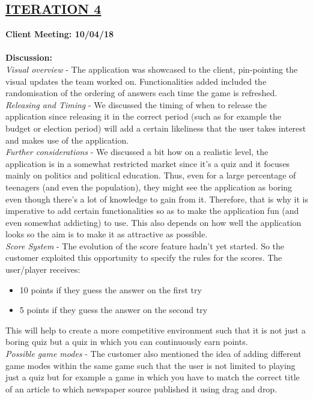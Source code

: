 \documentclass[paper=a4,fontsize=11pt]{article}
\newcommand{\SectionPart}[1]{\subsection*{\uppercase{#1}}}
\begin{document}
\SectionPart{\ul{Iteration 4}}
\hfill \textbf{Client Meeting: 10/04/18} \\
\\
\textbf{Discussion:}\\
\noindent
\textit{Visual overview} -
The application was showcased to the client, pin-pointing the visual updates the team worked on.
Functionalities added included the randomisation of the ordering of answers each time the game is refreshed.\\

\noindent
\textit{Releasing and Timing} -
We discussed the timing of when to release the application since releasing it in the correct
period (such as for example the budget or election period) will add a certain likeliness that the
user takes interest and makes use of the application.\\

\noindent
\textit{Further considerations} -
We discussed a bit how on a realistic level, the application is in a somewhat restricted market
since it’s a quiz and it focuses mainly on politics and political education. Thus, even for a
large percentage of teenagers (and even the population), they might see the application as
boring even though there's a lot of knowledge to gain from it. Therefore, that is why it is
imperative to add certain functionalities so as to make the application fun (and even
somewhat addicting) to use. This also depends on how well the application looks so the aim
is to make it as attractive as possible.\\

\noindent
\textit{Score System} -
The evolution of the score feature hadn't yet started. So the customer exploited this
opportunity to specify the rules for the scores. The user/player receives:
\begin{itemize}
	\item 10 points if they guess the answer on the first try
	\item 5 points if they guess the answer on the second try
\end{itemize}
This will help to create a more competitive environment such that it is not just a boring quiz
but a quiz in which you can continuously earn points.\\

\noindent
\textit{Possible game modes} -
The customer also mentioned the idea of adding different game modes within the same game
such that the user is not limited to playing just a quiz but for example a game in which you
have to match the correct title of an article to which newspaper source published it using drag
and drop.\\
\end{document}
